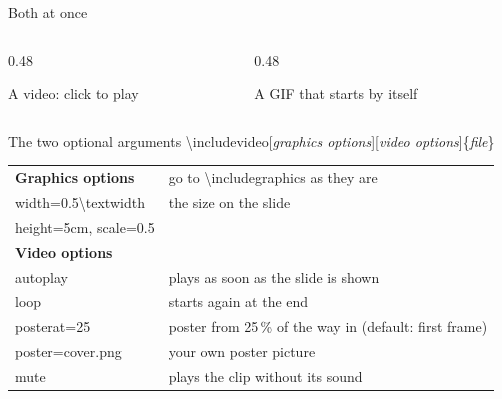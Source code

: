 \documentclass[aspectratio=169]{beamer}
\newcommand{\code}[1]{{\small\ttfamily #1}}
\begin{document}
\begin{frame}{Both at once}
  \begin{columns}[c]
    \begin{column}{0.48\textwidth}
      \par\smallskip\centering\small A video: click to play
    \end{column}
    \begin{column}{0.48\textwidth}
      \centering
      \par\smallskip\small A GIF that starts by itself
    \end{column}
  \end{columns}
\end{frame}

\begin{frame}{The two optional arguments}
  \centering
  \code{\textbackslash includevideo[\emph{graphics options}][\emph{video options}]\{\emph{file}\}}
  \par\bigskip
  \begin{tabular}{@{}ll@{}}
    \toprule
    \textbf{Graphics options} & go to \code{\textbackslash includegraphics} as they are \\
    \code{width=0.5\textbackslash textwidth} & the size on the slide \\
    \code{height=5cm}, \code{scale=0.5} & \\
    \midrule
    \textbf{Video options} & \\
    \code{autoplay} & plays as soon as the slide is shown \\
    \code{loop} & starts again at the end \\
    \code{posterat=25} & poster from 25\,\% of the way in (default: first frame) \\
    \code{poster=cover.png} & your own poster picture \\
    \code{mute} & plays the clip without its sound \\
    \bottomrule
  \end{tabular}
\end{frame}
\end{document}
